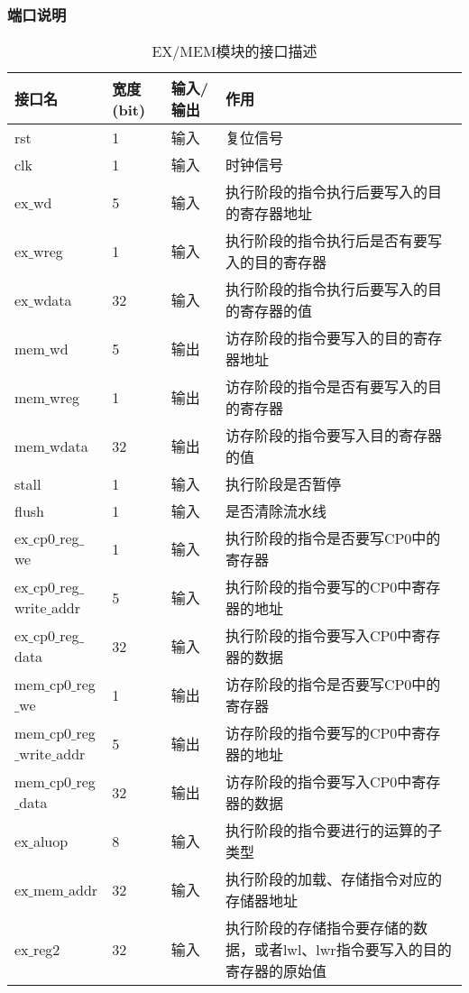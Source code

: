 \subsubsection{端口说明}
\begin{table}[H]
	\centering
	\caption{EX/MEM模块的接口描述}
	\begin{tabular}{|l|l|l|l|}
		\hline
		接口名 & 宽度(bit) & 输入/输出 & 作用 \\
		\hline
		rst & 1 & 输入 & 复位信号 \\
		\hline
		clk & 1 & 输入 & 时钟信号 \\
		\hline
		ex$\_$wd & 5 & 输入 & 执行阶段的指令执行后要写入的目的寄存器地址 \\
		\hline
		ex$\_$wreg & 1 & 输入 & 执行阶段的指令执行后是否有要写入的目的寄存器 \\
		\hline
		ex$\_$wdata & 32 & 输入 & 执行阶段的指令执行后要写入的目的寄存器的值 \\
		\hline
		mem$\_$wd & 5 & 输出 & 访存阶段的指令要写入的目的寄存器地址 \\
		\hline
		mem$\_$wreg & 1 & 输出 & 访存阶段的指令是否有要写入的目的寄存器 \\
		\hline
		mem$\_$wdata & 32 & 输出 & 访存阶段的指令要写入目的寄存器的值 \\
		\hline
		stall & 1 & 输入 & 执行阶段是否暂停 \\
		\hline
		flush & 1 & 输入 & 是否清除流水线 \\
		\hline
		ex$\_$cp0$\_$reg$\_$we & 1 & 输入 & 执行阶段的指令是否要写CP0中的寄存器 \\
		\hline
		ex$\_$cp0$\_$reg$\_$write$\_$addr & 5 & 输入 & 执行阶段的指令要写的CP0中寄存器的地址 \\
		\hline
		ex$\_$cp0$\_$reg$\_$data & 32 & 输入 & 执行阶段的指令要写入CP0中寄存器的数据 \\
		\hline
		mem$\_$cp0$\_$reg$\_$we & 1 & 输出 & 访存阶段的指令是否要写CP0中的寄存器 \\
		\hline
		mem$\_$cp0$\_$reg$\_$write$\_$addr & 5 & 输出 & 访存阶段的指令要写的CP0中寄存器的地址 \\
		\hline
		mem$\_$cp0$\_$reg$\_$data & 32 & 输出 & 访存阶段的指令要写入CP0中寄存器的数据 \\
		\hline
		ex$\_$aluop & 8 & 输入 & 执行阶段的指令要进行的运算的子类型 \\
		\hline
		ex$\_$mem$\_$addr & 32 & 输入 & 执行阶段的加载、存储指令对应的存储器地址 \\
		\hline
		ex$\_$reg2 & 32 & 输入 & 执行阶段的存储指令要存储的数据，或者lwl、lwr指令要写入的目的寄存器的原始值 \\

\end{tabular}
\end{table}
